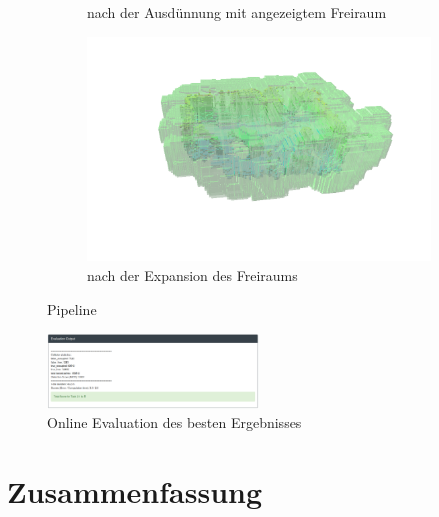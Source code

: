 \documentclass[12pt,titlepage, a4paper]{article}
\begin{document}
\begin{figure}[h!]
\begin{subfigure}[h]{0.45\textwidth}
		\caption{nach der Ausdünnung mit angezeigtem Freiraum}
	\end{subfigure}
	\begin{subfigure}[h]{0.45\textwidth}
		\includegraphics[width=\textwidth]{./maps/afterMorph_free.png}
		\caption{nach der Expansion des Freiraums}
	\end{subfigure}
 \caption{Pipeline}
\end{figure}

\begin{figure}[h!]
 \centering
 \includegraphics[width=0.5\textwidth]{./Screens/evaltask2.png}
 \caption{Online Evaluation des besten Ergebnisses}
\end{figure}

\FloatBarrier
\clearpage
\section{Zusammenfassung}
\end{document}
